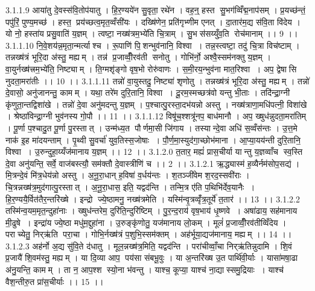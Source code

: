 3.1.1.9
आया॑तु दे॒वस्स॑वि॒तोप॑यातु । हि॒र॒ण्यये॑न सु॒वृता॒ रथे॑न । वह॒न्॒ हस्त॑ सु॒भग॑व्विँद्म॒नाप॑सम् । प्र॒यच्छ॑न्तं॒ पपु॑रिं॒ पुण्य॒मच्छ॑ । हस्त॒ प्रय॑च्छत्व॒मृत॒व्वँसी॑यः । दख्षि॑णेन॒ प्रति॑गृभ्णीम एनत् । दा॒तार॑म॒द्य स॑वि॒ता वि॑देय । यो नो॒ हस्ता॑य प्रसु॒वाति॑ य॒ज्ञम् । त्वष्टा॒ नख्ष॑त्रम॒भ्ये॑ति चि॒त्राम् । सु॒भस॑सय्युँव॒ति रोच॑मानाम् ।। 9 ।।
3.1.1.10
नि॒वे॒शय॑न्न॒मृता॒न्मर्त्या॑श्च । रू॒पाणि॑ पि॒॒शन्भुव॑नानि॒ विश्वा । तन्न॒स्त्वष्टा॒ तदु॑ चि॒त्रा विच॑ष्टाम् । तन्नख्ष॑त्रं भूरि॒दा अ॑स्तु॒ मह्यम् । तन्न॑ प्र॒जाव्वीँ॒रव॑ती सनोतु । गोभि॑र्नो॒ अश्वै॒स्सम॑नक्तु य॒ज्ञम् । वा॒युर्नख्ष॑त्त्रम॒भ्ये॑ति॒ निष्ट्याम् । ति॒ग्मशृ॑ङ्गो वृष॒भो रोरु॑वाणः । स॒मी॒रय॒न्भुव॑ना मात॒रिश्वा । अप॒ द्वेषा॑सि नुदता॒मरा॑तीः ।। 10 ।।
3.1.1.11
तन्नो॑ वा॒युस्तदु॒ निष्ट्या॑ शृणोतु । तन्नख्ष॑त्रं भूरि॒दा अ॑स्तु॒ मह्यम् । तन्नो॑ दे॒वासो॒ अनु॑जानन्तु॒ कामम् । यथा॒ तरे॑म दुरि॒तानि॒ विश्वा । दू॒रम॒स्मच्छत्र॑वो यन्तु भी॒ताः । तदि॑न्द्रा॒ग्नी कृ॑णुता॒न्तद्विशा॑खे । तन्नो॑ दे॒वा अनु॑मदन्तु य॒ज्ञम् । प॒श्चात्पु॒रस्ता॒दभ॑यन्नो अस्तु । नख्ष॑त्राणा॒मधि॑पत्नी॒ विशा॑खे । श्रेष्ठा॑विन्द्रा॒ग्नी भुव॑नस्य गो॒पौ ।। 11 ।।
3.1.1.12
विषू॑च॒श्शत्रू॑नप॒ बाध॑मानौ । अप॒ ख्षुध॑न्नुदता॒मरा॑तिम् । पू॒र्णा प॒श्चादु॒त पू॒र्णा पु॒रस्तात् । उन्म॑ध्य॒त पौर्णमा॒सी जि॑गाय । तस्यान्दे॒वा अधि॑ स॒व्वँस॑न्तः । उ॒त्त॒मे नाक॑ इ॒ह मा॑दयन्ताम् । पृ॒थ्वी सु॒वर्चा॑ युव॒तिस्स॒जोषाः । पौ॒र्ण॒मा॒स्युद॑गा॒च्छोभ॑माना । आ॒प्या॒यय॑न्ती दुरि॒तानि॒ विश्वा । उ॒रुन्दुहा॒य्यँज॑मानाय य॒ज्ञम् ।। 12 ।।
3.1.2.0
त॒तार॒ मह्यं॑ प्रास॒चीर्या यान्तु य॒ज्ञव्वाँच॑ स्व॒स्ति दे॒वा अनु॑यन्ति॒ सर्वे॒ वाज॑बस्त्यौ॒ सम॑क्तौ दे॒वास्त्रीणि॑ च ।। 2 ।।
3.1.2.1
ऋ॒द्ध्यास्म॑ ह॒व्यैर्नम॑सोप॒सद्य॑ । मि॒त्रन्दे॒वं मि॑त्र॒धेय॑न्नो अस्तु । अ॒नू॒रा॒धान् ह॒विषा॑ व॒र्धय॑न्तः । श॒तञ्जी॑वेम श॒रद॒स्सवी॑राः । चि॒त्रन्नख्ष॑त्र॒मुद॑गात्पु॒रस्तात् । अ॒नू॒रा॒धास॒ इति॒ यद्वद॑न्ति । तन्मि॒त्र ए॑ति प॒थिभि॑र्देव॒यानैः । हि॒र॒ण्ययै॒र्वित॑तैर॒न्तरि॑ख्षे । इन्द्रो ज्ये॒ष्ठामनु॒ नख्ष॑त्रमेति । यस्मि॑न्वृ॒त्रव्वृँ॑त्र॒तूर्ये॑ त॒तार॑ ।। 13 ।।
3.1.2.2
तस्मि॑न्व॒यम॒मृत॒न्दुहा॑नाः । ख्षुध॑न्तरेम॒ दुरि॑ति॒न्दुरि॑ष्टिम् । पु॒र॒न्द॒राय॑ वृष॒भाय॑ धृ॒ष्णवे । अषा॑ढाय॒ सह॑मानाय मी॒ढुषे । इन्द्रा॑य ज्ये॒ष्ठा मधु॑म॒द्दुहा॑ना । उ॒रुङ्कृ॑णोतु॒ यज॑मानाय लो॒कम् । मूलं॑ प्र॒जाव्वीँ॒रव॑तीव्विँदेय । पराच्येतु॒ निर्‌ऋ॑ति परा॒चा । गोभि॒र्नख्ष॑त्रं प॒शुभि॒स्सम॑क्तम् । अह॑र्भूया॒द्यज॑मानाय॒ मह्यम् ।। 14 ।।
3.1.2.3
अह॑र्नो अ॒द्य सु॑वि॒ते द॑धातु । मूल॒न्नख्ष॑त्र॒मिति॒ यद्वद॑न्ति । परा॑चीव्वाँ॒चा निर्‌ऋ॑तिन्नुदामि । शि॒वं प्र॒जायै॑ शि॒वम॑स्तु॒ मह्यम् । या दि॒व्या आप॒ पय॑सा संबभू॒वुः । या अ॒न्तरि॑ख्ष उ॒त पार्थि॑वी॒र्याः । यासा॑मषा॒ढा अ॑नु॒यन्ति॒ कामम् । ता न॒ आप॒श्श स्यो॒ना भ॑वन्तु । याश्च॒ कूप्या॒ याश्च॑ ना॒द्यास्समु॒द्रियाः । याश्च॑ वैश॒न्तीरु॒त प्रा॑स॒चीर्याः ।। 15 ।।
